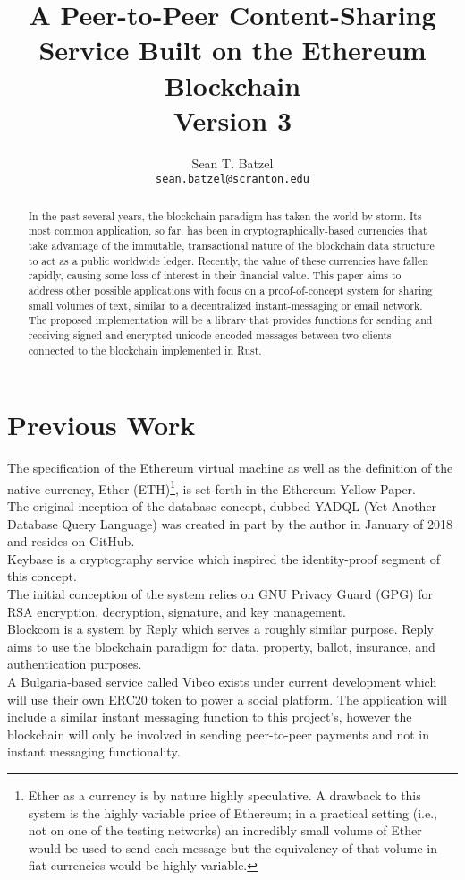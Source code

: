 \documentclass[]{article}
\title{A Peer-to-Peer Content-Sharing Service Built on the Ethereum Blockchain\\\large Version 3}
\author{Sean T. Batzel\\\texttt{sean.batzel@scranton.edu}}
\begin{document}
\maketitle
\tableofcontents

\pagebreak

\begin{abstract}
  In the past several years, the \gls{blockchain} paradigm has taken the world by storm. Its most common application, so far, has been in cryptographically-based currencies that take advantage of the immutable, transactional nature of the blockchain data structure to act as a public worldwide ledger. Recently, the value of these currencies have fallen rapidly, causing some loss of interest in their financial value. This paper aims to address other possible applications with focus on a proof-of-concept system for sharing small volumes of text, similar to a decentralized instant-messaging or email network. The proposed implementation will be a library that provides functions for sending and receiving signed and encrypted unicode-encoded messages between two clients connected to the blockchain implemented in Rust.
\end{abstract}

\section{Previous Work}
The specification of the Ethereum virtual machine as well as the definition of the native currency, Ether (ETH)\footnote{Ether as a currency is by nature highly speculative. A drawback to this system is the highly variable price of Ethereum; in a practical setting (i.e., not on one of the testing networks) an incredibly small volume of Ether would be used to send each message but the equivalency of that volume in fiat currencies would be highly variable.}, is set forth in the Ethereum Yellow Paper\cite{yellowpaper}.\\
The original inception of the database concept, dubbed YADQL (Yet Another Database Query Language) was created in part by the author in January of 2018 and resides on GitHub\cite{yadql}.\\
Keybase is a cryptography service which inspired the identity-proof segment of this concept.\cite{keybase}\\
The initial conception of the system relies on GNU Privacy Guard (GPG) for RSA encryption, decryption, signature, and key management\cite{gpg}.\\
Blockcom is a system by Reply which serves a roughly similar purpose. Reply aims to use the blockchain paradigm for data, property, ballot, insurance, and authentication purposes\cite{reply}.\\
A Bulgaria-based service called Vibeo exists under current development which will use their own ERC20 token to power a social platform. The application will include a similar instant messaging function to this project's, however the blockchain will only be involved in sending peer-to-peer payments and not in instant messaging functionality\cite{vibeo}.
\end{document}
